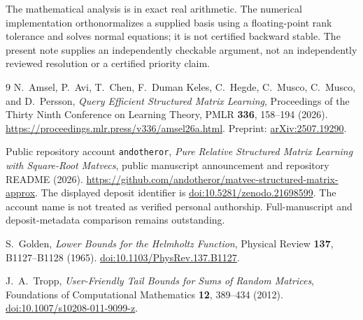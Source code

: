 \documentclass[11pt]{article}
\begin{document}
The mathematical analysis is in exact real arithmetic. The numerical implementation orthonormalizes a supplied basis using a floating-point rank tolerance and solves normal equations; it is not certified backward stable. The present note supplies an independently checkable argument, not an independently reviewed resolution or a certified priority claim.

\begin{thebibliography}{9}
N.~Amsel, P.~Avi, T.~Chen, F.~Duman Keles, C.~Hegde, C.~Musco, C.~Musco, and D.~Persson,
\emph{Query Efficient Structured Matrix Learning},
Proceedings of the Thirty Ninth Conference on Learning Theory,
PMLR \textbf{336}, 158--194 (2026).
\url{https://proceedings.mlr.press/v336/amsel26a.html}.
Preprint: \href{https://arxiv.org/abs/2507.19290}{arXiv:2507.19290}.

Public repository account \texttt{andotheror},
\emph{Pure Relative Structured Matrix Learning with Square-Root Matvecs},
public manuscript announcement and repository README (2026).
\url{https://github.com/andotheror/matvec-structured-matrix-approx}.
The displayed deposit identifier is
\href{https://doi.org/10.5281/zenodo.21698599}{doi:10.5281/zenodo.21698599}.
The account name is not treated as verified personal authorship. Full-manuscript and deposit-metadata comparison remains outstanding.

S.~Golden, \emph{Lower Bounds for the Helmholtz Function},
Physical Review \textbf{137}, B1127--B1128 (1965).
\href{https://doi.org/10.1103/PhysRev.137.B1127}{doi:10.1103/PhysRev.137.B1127}.

J.~A.~Tropp, \emph{User-Friendly Tail Bounds for Sums of Random Matrices},
Foundations of Computational Mathematics \textbf{12}, 389--434 (2012).
\href{https://doi.org/10.1007/s10208-011-9099-z}{doi:10.1007/s10208-011-9099-z}.
\end{thebibliography}
\end{document}
